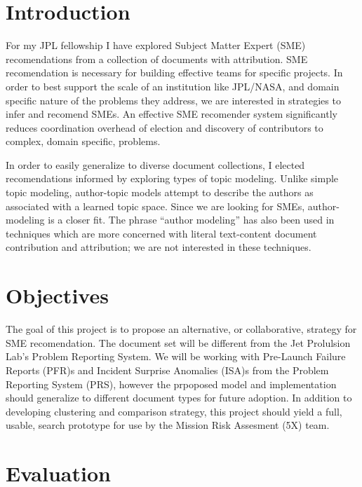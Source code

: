 \documentclass{article}
\begin{document}
\begin{multicols}{2}

\section{Introduction}

For my JPL fellowship I have explored Subject Matter Expert (SME) recomendations
from a collection of documents with attribution. SME recomendation is necessary for
building effective teams for specific projects. In order to best support the scale of an
institution like JPL/NASA, and domain specific nature of the problems they address, we are
interested in strategies to infer and recomend SMEs. An effective SME recomender system
significantly reduces coordination overhead of election and discovery of
contributors to complex, domain specific, problems.

In order to easily generalize to diverse document collections, I elected
recomendations informed by exploring types of topic modeling.
Unlike simple topic modeling, author-topic models attempt to describe the authors as
associated with a learned topic space. Since we are looking for SMEs,
author-modeling is a closer fit. The phrase ``author modeling'' has also been used
in techniques which are more concerned with literal text-content document
contribution and attribution\cite{Rexha2018}; we are not interested in these techniques.

\section{Objectives}

The goal of this project is to propose an alternative, or collaborative, strategy for
SME recomendation. The document set will be different from the Jet Prolulsion Lab's
Problem Reporting System. We will be working with Pre-Launch Failure Reports (PFR)s and
Incident Surprise Anomalies (ISA)s from the Problem Reporting System
(PRS), however the prpoposed model and implementation should generalize to different
document types for future adoption.
In addition to developing clustering and comparison strategy, this project should yield
a full, usable, search prototype for use by the Mission Risk Assesment (5X) team.

\section{Evaluation}


\end{multicols}
\end{document}
